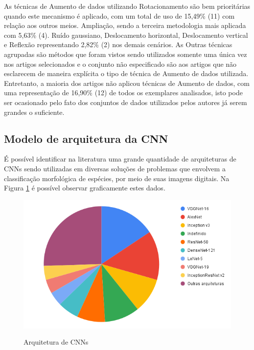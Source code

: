 \documentclass[
	12pt,				%
	oneside,			%
	a4paper,			%
	english,			%
	brazil				%
	]{abntex2ppgsi}
\begin{document}
As técnicas de Aumento de dados utilizando Rotacionamento são bem prioritárias quando este mecanismo é aplicado, com um total de uso de 15,49\% (11) com relação aos outros meios. Ampliação, sendo a terceira metodologia mais aplicada com 5,63\% (4). Ruído gaussiano, Deslocamento horizontal, Deslocamento vertical e Reflexão representando 2,82\% (2) nos demais cenários. As Outras técnicas agrupadas são métodos que foram vistos sendo utilizados somente uma única vez nos artigos selecionados e o conjunto não especificado são aos artigos que não esclarecem de maneira explícita o tipo de técnica de Aumento de dados utilizada. Entretanto, a maioria dos artigos não aplicou técnicas de Aumento de dados, com uma representação de 16,90\% (12) de todos os exemplares analisados, isto pode ser ocasionado pelo fato dos conjuntos de dados utilizados pelos autores já serem grandes o suficiente.

\subsection{Modelo de arquitetura da CNN}
É possível identificar na literatura uma grande quantidade de arquiteturas de CNNs sendo utilizadas em diversas soluções de problemas que envolvem a classificação morfológica de espécies, por meio de suas imagens digitais. Na Figura \ref{fig:grafico_arquitetura_vs_uso} é possível observar graficamente estes dados.

\begin{figure}[H]
    \centering
    \caption{Arquitetura de CNNs}
    \includegraphics[width=1.0\textwidth]{imagens/revisao_sistematica/grafico_arquitetura_vs_uso.png}
    \label{fig:grafico_arquitetura_vs_uso}
\end{figure}
\end{document}
